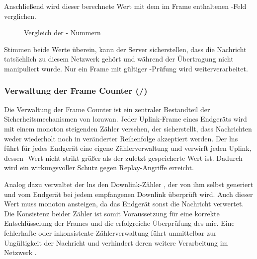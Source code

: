 	Anschlie{\ss}end wird dieser berechnete Wert mit dem im Frame enthaltenen -Feld verglichen.
	
	\begin{figure}[H]
		\centering
		\caption{Vergleich der  - Nummern\cite{Montagny:2022}}
	\end{figure}
	
	 Stimmen beide Werte überein, kann der Server sicherstellen, dass die Nachricht tatsächlich zu diesem Netzwerk gehört und während der Übertragung nicht manipuliert wurde. Nur ein Frame mit gültiger -Prüfung wird weiterverarbeitet.

	
\subsubsection{Verwaltung der Frame Counter (/)}
	Die Verwaltung der Frame Counter ist ein zentraler Bestandteil der Sicherheitsmechanismen von \ac{lorawan}. Jeder Uplink-Frame eines Endgeräts wird mit einem monoton steigenden Zähler  versehen, der sicherstellt, dass Nachrichten weder wiederholt noch in veränderter Reihenfolge akzeptiert werden. Der \ac{lns} führt für jedes Endgerät eine eigene Zählerverwaltung und verwirft jeden Uplink, dessen -Wert nicht strikt grö{\ss}er als der zuletzt gespeicherte Wert ist. Dadurch wird ein wirkungsvoller Schutz gegen Replay-Angriffe erreicht.

	Analog dazu verwaltet der \ac{lns} den Downlink-Zähler , der von ihm selbst generiert und vom Endgerät bei jedem empfangenen Downlink überprüft wird. Auch dieser Wert muss monoton ansteigen, da das Endgerät sonst die Nachricht verwertet. Die Konsistenz beider Zähler ist somit Voraussetzung für eine korrekte Entschlüsselung der Frames und die erfolgreiche Überprüfung des \ac{mic}. Eine fehlerhafte oder inkonsistente Zählerverwaltung führt unmittelbar zur Ungültigkeit der Nachricht und verhindert deren weitere Verarbeitung im Netzwerk \cite{Montagny:2022} \cite{LoRaAlliance:2020b} \cite{LoRaAlliance:2020c}.

